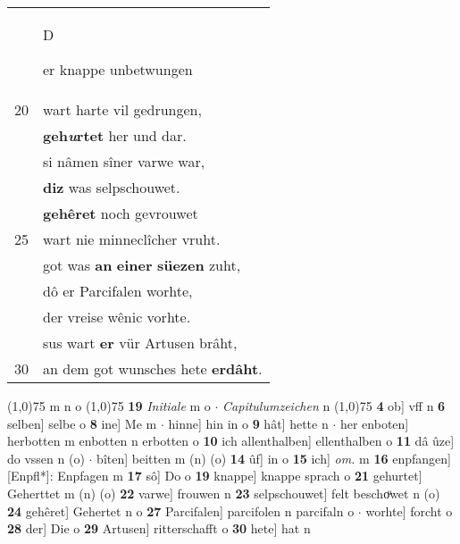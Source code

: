 \documentclass[8pt,a4paper,notitlepage]{article}
\begin{document}
\begin{table}[ht]
\begin{minipage}[t]{0.5\linewidth}
\begin{tabular}{rl}
 & \begin{large}D\end{large}er knappe unbetwungen\\ 
20 & wart harte vil gedrungen,\\ 
 & \textbf{geh\textit{u}rtet} her und dar.\\ 
 & si nâmen sîner varwe war,\\ 
 & \textbf{diz} was selpschouwet.\\ 
 & \textbf{gehêret} noch gevrouwet\\ 
25 & wart nie minneclîcher vruht.\\ 
 & got was \textbf{an} \textbf{einer} \textbf{süezen} zuht,\\ 
 & dô er Parcifalen worhte,\\ 
 & der vreise wênic vorhte.\\ 
 & sus wart \textbf{er} vür Artusen brâht,\\ 
30 & an dem got wunsches hete \textbf{erdâht}.\\ 
\end{tabular}
\scriptsize
\line(1,0){75} \newline
m n o \newline
\line(1,0){75} \newline
\textbf{19} \textit{Initiale} m o   $\cdot$ \textit{Capitulumzeichen} n  \newline
\line(1,0){75} \newline
\textbf{4} ob] vff n \textbf{6} selben] selbe o \textbf{8} ine] Me m  $\cdot$ hinne] hin in o \textbf{9} hât] hette n  $\cdot$ her enboten] herbotten m enbotten n erbotten o \textbf{10} ich allenthalben] ellenthalben o \textbf{11} dâ ûze] do vssen n (o)  $\cdot$ bîten] beitten m (n) (o) \textbf{14} ûf] in o \textbf{15} ich] \textit{om.} m \textbf{16} enpfangen] [Enpfl*]: Enpfagen m \textbf{17} sô] Do o \textbf{19} knappe] knappe sprach o \textbf{21} gehurtet] Geherttet m (n) (o) \textbf{22} varwe] frouwen n \textbf{23} selpschouwet] felt beschoͧwet n (o) \textbf{24} gehêret] Gehertet n o \textbf{27} Parcifalen] parcifolen n parcifaln o  $\cdot$ worhte] forcht o \textbf{28} der] Die o \textbf{29} Artusen] ritterschafft o \textbf{30} hete] hat n \newline
\end{minipage}
\end{table}
\newpage
\end{document}
